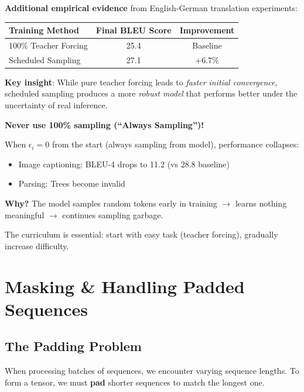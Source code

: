 \documentclass{article}
\begin{document}
\vspace{0.3cm}

\textbf{Additional empirical evidence} from English-German translation experiments:

\begin{center}
\begin{tabular}{|l|c|c|}
\hline
\textbf{Training Method} & \textbf{Final BLEU Score} & \textbf{Improvement} \\
\hline
100\% Teacher Forcing & 25.4 & Baseline \\
Scheduled Sampling & 27.1 & +6.7\% \\
\hline
\end{tabular}
\end{center}

\textbf{Key insight}: While pure teacher forcing leads to \textit{faster initial convergence}, scheduled sampling produces a more \textit{robust model} that performs better under the uncertainty of real inference.

\begin{tcolorbox}[colback=red!5!white, colframe=red!50!black, title=Critical Warning]
\textbf{Never use 100\% sampling (``Always Sampling'')!}

When $\epsilon_i = 0$ from the start (always sampling from model), performance collapses:
\begin{itemize}
\item Image captioning: BLEU-4 drops to 11.2 (vs 28.8 baseline)
\item Parsing: Trees become invalid
\end{itemize}

\textbf{Why?} The model samples random tokens early in training $\rightarrow$ learns nothing meaningful $\rightarrow$ continues sampling garbage.

The curriculum is essential: start with easy task (teacher forcing), gradually increase difficulty.
\end{tcolorbox}

\section{Masking \& Handling Padded Sequences}

\subsection{The Padding Problem}

When processing batches of sequences, we encounter varying sequence lengths. To form a tensor, we must \textbf{pad} shorter sequences to match the longest one.
\end{document}
